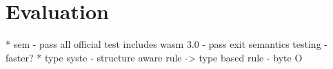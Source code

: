 
\chapter{Evaluation}
\label{ch:eval}
\noindent

* sem
  - pass all official test includes wasm 3.0
  - pass exit semantics testing
  - faster?
* type syste
  - structure aware rule -> type based rule
  - byte O
